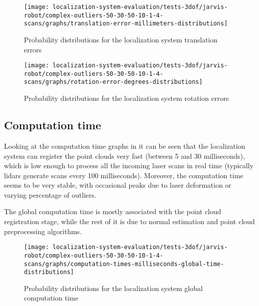 \begin{figure}[H]
	\centering
	\begin{minipage}[H]{0.47\textwidth}
		\centering
		\texttt{[image: localization-system-evaluation/tests-3dof/jarvis-robot/complex-outliers-50-30-50-10-1-4-scans/graphs/translation-error-millimeters-distributions]}
		\caption{Probability distributions for the localization system translation errors}
		\label{fig:localization-system-evaluation_complex-path-with-outliers-50-30-50-10cm-per-sec-velocity-1-4-translation-error}
	\end{minipage}\hfill
	\begin{minipage}[H]{0.47\textwidth}
		\centering
		\texttt{[image: localization-system-evaluation/tests-3dof/jarvis-robot/complex-outliers-50-30-50-10-1-4-scans/graphs/rotation-error-degrees-distributions]}
		\caption{Probability distributions for the localization system rotation errors}
		\label{fig:localization-system-evaluation_complex-path-with-outliers-50-30-50-10cm-per-sec-velocity-1-4-rotation-error}
	\end{minipage}
\end{figure}



\subsection{Computation time}

Looking at the computation time graphs in  it can be seen that the localization system can register the point clouds very fast (between 5 and 30 milliseconds), which is low enough to process all the incoming laser scans in real time (typically \glspl{lidar} generate scans every 100 milliseconds). Moreover, the computation time seems to be very stable, with occasional peaks due to laser deformation or varying percentage of outliers.

The global computation time is mostly associated with the point cloud registration stage, while the rest of it is due to normal estimation and point cloud preprocessing algorithms.

\begin{figure}[H]
	\centering
	\texttt{[image: localization-system-evaluation/tests-3dof/jarvis-robot/complex-outliers-50-30-50-10-1-4-scans/graphs/computation-times-milliseconds-global-time-distributions]}
	\caption{Probability distributions for the localization system global computation time}
	\label{fig:localization-system-evaluation_complex-path-with-outliers-50-30-50-10cm-per-sec-velocity-1-4-scans-computation-time}
\end{figure}



